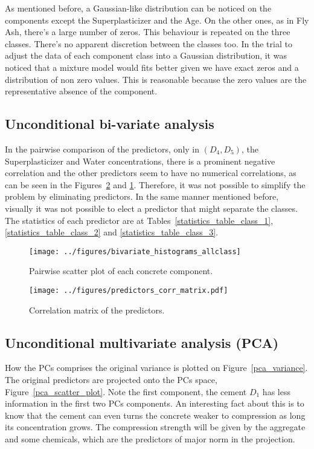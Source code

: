 \documentclass[conference]{IEEEtran}
\begin{document}
As mentioned before, a Gaussian-like distribution can be noticed on the components except the Superplasticizer and the Age. On the other ones, as in Fly Ash, there's a large number of zeros. This behaviour is repeated on the three classes. There's no apparent discretion between the classes too. In the trial to adjust the data of each component class into a Gaussian distribution, it was noticed that a mixture model would fits better given we have exact zeros and a distribution of non zero values. This is reasonable because the zero values are the representative absence of the component.

\subsection{Unconditional bi-variate analysis}

In the pairwise comparison of the predictors, only in $(D_4,D_5)$, the Superplasticizer and Water concentrations, there is a prominent negative correlation and the other predictors seem to have no numerical correlations, as can be seen in the Figures~\ref{corr_matrix} and \ref{histogram_biplot}. Therefore, it was not possible to simplify the problem by eliminating predictors. In the same manner mentioned before, visually it was not possible to elect a predictor that might separate the classes. The statistics of each predictor are at Tables~\ref{statistics_table_class_1}, \ref{statistics_table_class_2} and \ref{statistics_table_class_3}.

\begin{figure}[htbp]
\centerline{\texttt{[image: ../figures/bivariate\_histograms\_allclass]}}
\caption{Pairwise scatter plot of each concrete component.}
\label{histogram_biplot}
\end{figure}

\begin{figure}[htbp]
\centering
\texttt{[image: ../figures/predictors\_corr\_matrix.pdf]}
\caption{Correlation matrix of the predictors.}
\label{corr_matrix}
\end{figure}

\subsection{Unconditional multivariate analysis (PCA)}

How the PCs comprises the original variance is plotted on Figure~\ref{pca_variance}. The original predictors are projected onto the PCs space, Figure~\ref{pca_scatter_plot}. Note the first component, the cement $D_1$ has less information in the first two PCs components. An interesting fact about this is to know that the cement can even turns the concrete weaker to compression as long its concentration grows. The compression strength will be given by the aggregate and some chemicals, which are the predictors of major norm in the projection.
\end{document}
